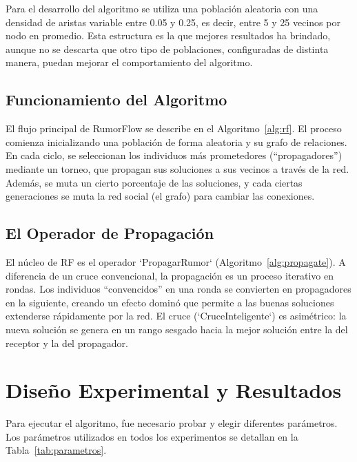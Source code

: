 \documentclass[11pt,a4paper]{article}
\begin{document}
Para el desarrollo del algoritmo se utiliza una población aleatoria con una densidad de aristas variable entre 0.05 y 0.25, es decir, 
entre 5 y 25 vecinos por nodo en promedio. Esta estructura es la que mejores resultados ha brindado, aunque no se descarta que otro tipo 
de poblaciones, configuradas de distinta manera, puedan mejorar el comportamiento del algoritmo.

\subsection{Funcionamiento del Algoritmo}

El flujo principal de RumorFlow se describe en el Algoritmo~\ref{alg:rf}. 
El proceso comienza inicializando una población de forma aleatoria y su grafo de relaciones. 
En cada ciclo, se seleccionan los individuos más prometedores (``propagadores'') 
mediante un torneo, que propagan sus soluciones a sus vecinos a través de la red.
Además, se muta un cierto porcentaje de las soluciones, y cada ciertas generaciones 
se muta la red social (el grafo) para cambiar las conexiones.

\subsection{El Operador de Propagación}
El núcleo de RF es el operador `PropagarRumor` (Algoritmo~\ref{alg:propagate}). 
A diferencia de un cruce convencional, la propagación es un proceso iterativo en rondas. 
Los individuos ``convencidos'' en una ronda se convierten en propagadores en la siguiente, 
creando un efecto dominó que permite a las buenas soluciones extenderse rápidamente por la red. 
El cruce (`CruceInteligente`) es asimétrico: la nueva solución se genera en un rango 
sesgado hacia la mejor solución entre la del receptor y la del propagador.

\newpage

\section{Diseño Experimental y Resultados}
Para ejecutar el algoritmo, fue necesario probar y elegir diferentes parámetros.
Los parámetros utilizados en todos los experimentos se detallan en la Tabla~\ref{tab:parametros}.
\end{document}

